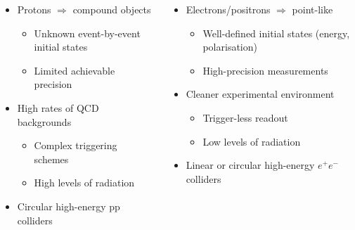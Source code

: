 \begin{frame}
  \vspace{-0.3cm}

  \begin{columns}[t]

    \begin{itemize}
    \item Protons $\Rightarrow$ compound objects
      \begin{itemize}
      \item Unknown event-by-event initial states
      \item Limited achievable precision
      \end{itemize}
    \item High rates of QCD backgrounds
      \begin{itemize}
      \item Complex triggering schemes
      \item High levels of radiation
      \end{itemize}
    \item Circular high-energy pp colliders
    \end{itemize}


    \begin{itemize}
    \item Electrons/positrons $\Rightarrow$ point-like
      \begin{itemize}
      \item Well-defined initial states (energy, polarisation)
      \item High-precision measurements
      \end{itemize}
    \item Cleaner experimental environment
      \begin{itemize}
      \item Trigger-less readout
      \item Low levels of radiation
      \end{itemize}
    \item Linear or circular high-energy $e^+e^-$ colliders
    \end{itemize}

  \end{columns}

\end{frame}

